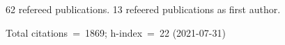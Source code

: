 62 refereed publications. 13 refeered publications as first author.

Total citations~=~1869; h-index~=~22 (2021-07-31)